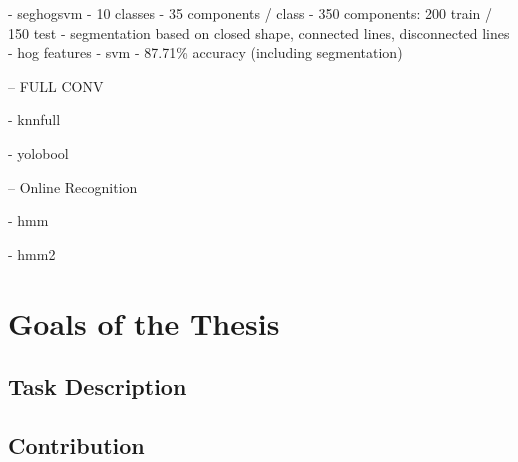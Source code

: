 - seghogsvm
- 10 classes
- 35 components / class
- 350 components: 200 train / 150 test
- segmentation based on closed shape, connected lines, disconnected lines
- hog features
- svm
- 87.71\% accuracy (including segmentation)


-- FULL CONV

- knnfull

- yolobool

-- Online Recognition

- hmm

- hmm2



\section{Goals of the Thesis}

\subsection{Task Description}

\subsection{Contribution}
